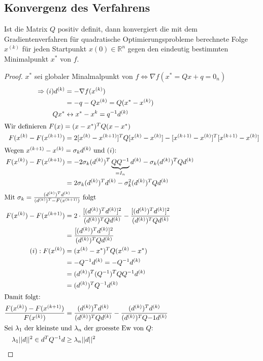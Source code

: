 \subsection{Konvergenz des Verfahrens}
\begin{Theorem}
Ist die Matrix $Q$ positiv definit, dann konvergiert die mit dem Gradientenverfahren für quadratische Optimierungsprobleme berechnete Folge {$x^{(k)}$} für jeden Startpunkt $x(0) \in \mathbb{R}^n$ gegen den eindeutig
bestimmten Minimalpunkt $x^{*}$ von $f$.
\end{Theorem}
\begin{proof}
$x^{*}$ sei globaler Minalmalpunkt von $f \Leftrightarrow \nabla f(x^{*}=Qx+q= 0_n) $
\begin{align*}
\Rightarrow (i) d^{(k)} &= - \nabla f(x^{(k)})\\
 &= -q-Qx^{(k)} = Q(x^{*}-x^{(k)})\\
Qx^{*} &\leftrightarrow x^{*} - x^{k} = q^{-1}d^{(k)}\\
\intertext{Wir definieren $F(x) = (x-x^{*})^TQ(x-x^{*})$}
F(x^{(k)} - F(x^{(k+1)}) &= 2[x^{(k)}-x^{(k+1)}]^TQ[x^{(k)}-x^{(k)}]-[x^{(k+1)}-x^{(k)}]^T[x^{(k+1)}-x^{(k)}]\\
\intertext{Wegen $x^{(k+1)}-x^{(k)} =\sigma_kd^{(k)}$ und $(i)$:}
F(x^{(k)})-F(x^{(k+1)}) &= -2\sigma_k(d^{(k)})^T\underbrace{QQ^{-1}}_{=I_n}d^{(k)}-\sigma_k(d^{(k)})^TQd^{(k)} \\
&= 2\sigma_k(d^{(k)})^Td^{(k)}-\sigma^2_k(d^{(k)})^TQd^{(k)}\\
\intertext{Mit $\sigma_k = \frac{(d^{(k)})^Td^{(k)}}{(d^{(k)})^T-F(x^{(k+1)})}$ folgt}
F(x^{(k)})-F(x^{(k+1)}) &= 2\cdot\frac{[(d^{(k)})^Td^{(k)}]^2}{(d^{(k)})^TQd^{(k)}}-\frac{[(d^{(k)})^Td^{(k)}]^2}{(d^{(k)})^TQd^{(k)}}\\
&= \frac{[(d^{(k)})^Td^{(k)}]^2}{(d^{(k)})^TQd^{(k)}}\\
(i):F(x^{(k)}) &= (x^{(k)}-x^{*})^TQ(x^{(k)}-x^{*})\\
&= -Q^{-1}d^{(k)} = -Q^{-1}d^{(k)}\\
&= (d^{(k)})^T(Q^{-1})^TQQ^{-1}d^{(k)}\\
&= (d^{(k)})^TQ^{-1}d^{(k)} \\
\intertext{Damit folgt:}
\frac{F(x^{(k)})-F(x^{(k+1)})}{F(x^{(k)})} &= \frac{(d^{(k)})^Td^{(k)}}{(d^{(k)})^TQd^{(k)}} - \frac{(d^{(k)})^Td^{(k)}}{(d^{(k)})^TQ{-1}d^{(k)}} \\
\intertext{Sei $\lambda_1$ der kleinste und $\lambda_n$ der groesste Ew von $Q$:}
\lambda_1||d||^2 \in d^TQ^{-1}d&\geq \lambda_n||d||^2\\

\end{align*}
\end{proof}
